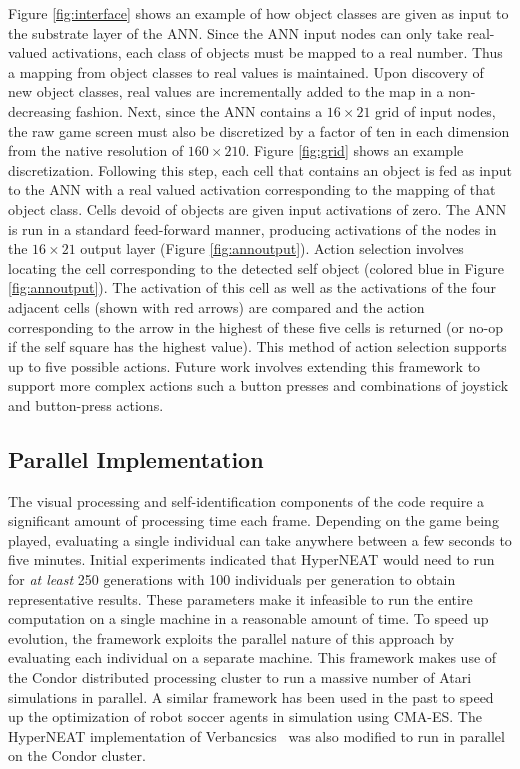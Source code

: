\documentclass{acm_proc_article-sp}
\begin{document}
Figure \ref{fig:interface} shows an example of how object classes are given as input to the substrate layer of the ANN. Since the ANN input nodes can only take real-valued activations, each class of objects must be mapped to a real number. Thus a mapping from object classes to real values is maintained. Upon discovery of new object classes, real values are incrementally added to the map in a non-decreasing fashion. Next, since the ANN contains a $16\times 21$ grid of input nodes, the raw game screen must also be discretized by a factor of ten in each dimension from the native resolution of $160\times 210$. Figure \ref{fig:grid} shows an example discretization. Following this step, each cell that contains an object is fed as input to the ANN with a real valued activation corresponding to the mapping of that object class. Cells devoid of objects are given input activations of zero. The ANN is run in a standard feed-forward manner, producing activations of the nodes in the $16\times 21$ output layer (Figure \ref{fig:annoutput}). Action selection involves locating the cell corresponding to the detected self object (colored blue in Figure \ref{fig:annoutput}). The activation of this cell as well as the activations of the four adjacent cells (shown with red arrows) are compared and the action corresponding to the arrow in the highest of these five cells is returned (or no-op if the self square has the highest value). This method of action selection supports up to five possible actions. Future work involves extending this framework to support more complex actions such a button presses and combinations of joystick and button-press actions.

\subsection{Parallel Implementation}
\label{sec:condor}
The visual processing and self-identification components of the code require a significant amount of processing time each frame. Depending on the game being played, evaluating a single individual can take anywhere between a few seconds to five minutes. Initial experiments indicated that HyperNEAT would need to run for \textit{at least} 250 generations with 100 individuals per generation to obtain representative results. These parameters make it infeasible to run the entire computation on a single machine in a reasonable amount of time. To speed up evolution, the framework exploits the parallel nature of this approach by evaluating each individual on a separate machine. This framework makes use of the Condor distributed processing cluster \cite{thain2005distributed} to run a massive number of Atari simulations in parallel. A similar framework has been used in the past to speed up the optimization of robot soccer agents in simulation using CMA-ES\cite{Urieli+MKBS:2010}. The HyperNEAT implementation of Verbancsics~\cite{verbancsics10} was also modified to run in parallel on the Condor cluster.
\end{document}
